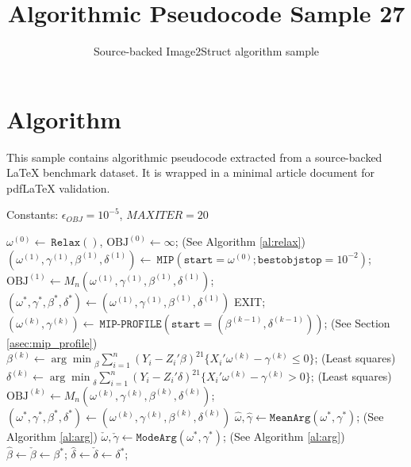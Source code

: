 \documentclass[11pt]{article}
\title{Algorithmic Pseudocode Sample 27}
\author{Source-backed Image2Struct algorithm sample}
\date{}
\begin{document}
\maketitle
\section{Algorithm}
This sample contains algorithmic pseudocode extracted from a source-backed LaTeX benchmark dataset. It is wrapped in a minimal article document for pdfLaTeX validation.

\begin{algorithm}[htbp]
\caption{Source-backed algorithmic procedure}
\begin{algorithm}
[h!]
\caption{MIP-CDA.}
Constants: $\epsilon_{OBJ}=10^{-5}$, $MAXITER=20$\\
\begin{algorithmic}[1]
\State $\omega^{(0)}\leftarrow~\texttt{Relax}()$, $\text{OBJ}^{(0)}\leftarrow \infty$; \hfill (See Algorithm \ref{al:relax})
\State $(\omega^{(1)}, \gamma^{(1)}, \beta^{(1)}, \delta^{(1)})\leftarrow~\texttt{MIP}(\texttt{start}=\omega^{(0)}; \texttt{bestobjstop}=10^{-2})$;
\State $\text{OBJ}^{(1)} \leftarrow M_n(\omega^{(1)}, \gamma^{(1)}, \beta^{(1)}, \delta^{(1)})$;
\State $(\omega^*, \gamma^*, \beta^*, \delta^*) \leftarrow (\omega^{(1)}, \gamma^{(1)}, \beta^{(1)}, \delta^{(1)})$
\State EXIT;
\EndIf
\State $(\omega^{(k)}, \gamma^{(k)})\leftarrow~\texttt{MIP-PROFILE}(\texttt{start}=(\beta^{(k-1)}, \delta^{(k-1)}))$; \hfill (See Section \ref{asec:mip_profile})
\State $\beta^{(k)} \leftarrow {\arg\min}_{\beta}\sum_{i=1}^n(Y_i - Z_i'\beta)^21\{X_i'\omega^{(k)} - \gamma^{(k)}\le 0\}$; \hfill (Least squares)
\State $\delta^{(k)}\leftarrow {\arg\min}_{\delta}\sum_{i=1}^n(Y_i - Z_i'\delta)^21\{X_i'\omega^{(k)} - \gamma^{(k)} > 0\}$; \hfill (Least squares)
\State $\text{OBJ}^{(k)} \leftarrow M_n(\omega^{(k)}, \gamma^{(k)}, \beta^{(k)}, \delta^{(k)})$;
\State $(\omega^*, \gamma^*, \beta^*, \delta^*) \leftarrow (\omega^{(k)}, \gamma^{(k)}, \beta^{(k)}, \delta^{(k)})$
\EndFor %
\State $\hat \omega, \hat \gamma \leftarrow \texttt{MeanArg}(\omega^*, \gamma^*)$; \hfill (See Algorithm \ref{al:arg})
\State $\check \omega, \check \gamma \leftarrow \texttt{ModeArg}(\omega^*, \gamma^*)$; \hfill (See Algorithm \ref{al:arg})
\State $\hat \beta \leftarrow \check \beta \leftarrow \beta^*$;
\State $\hat \delta \leftarrow \check\delta \leftarrow \delta^*$;
\end{algorithmic}
\end{algorithm}
\end{algorithm}
\end{document}
